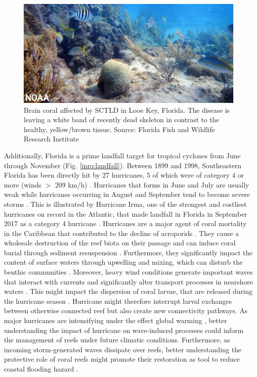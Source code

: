 \begin{figure}
    \centering
    \includegraphics[width=\textwidth]{chapters/intro/figures/sctld.jpg}
    \caption{Brain coral affected by SCTLD in Looe Key, Florida. The disease is leaving a white band of recently dead skeleton in contrast to the healthy, yellow/brown tissue. Source: Florida Fish and Wildlife Research Institute}
    \label{intro:sctld}
\end{figure}

Additionally, Florida is a prime landfall target for tropical cyclones from June through November (Fig. \ref{inro:landfall}). Between 1899 and 1998, Southeastern Florida has been directly hit by 27 hurricanes, 5 of which were of category 4 or more (winds $>$ 209 km/h) \citep{neumann1999tropical}. Hurricanes that forms in June and July are usually weak while hurricanes occurring in August and September tend to become severe storms \citep{banks2008reef}. This is illustrated by Hurricane Irma, one of the strongest and costliest hurricanes on record in the Atlantic, that made landfall in Florida in September 2017 as a category 4 hurricane \citep{irmaNOAA, xian2018brief}. Hurricanes are a major agent of coral mortality in the Caribbean that contributed to the decline of acroporids \citep{gardner2003long,aronson2001white}. They cause a wholesale destruction of the reef biota on their passage and can induce coral burial through sediment resuspension \citep{banks2008reef, miller2008effects, tweel2014contribution}. Furthermore, they significantly impact the content of surface waters through upwelling and mixing, which can disturb the benthic communities \citep{wachnicka2019hurricane,varlas2020investigating}. Moreover, heavy wind conditions generate important waves that interact with currents and significantly alter transport processes in nearshore waters \citep{niu2017role,mao2020particle}. This might impact the dispersion of coral larvae, that are released during the hurricane season \citep{frys2020fine}. Hurricane might therefore interrupt larval exchanges between otherwise connected reef but also create new connectivity pathways. As major hurricanes are intensifying under the effect global warming \citep{bhatia2019recent,knutson2020tropical}, better understanding the impact of hurricane on wave-induced processes could inform the management of reefs under future climatic conditions. Furthermore, as incoming storm-generated waves dissipate over reefs, better understanding the protective role of coral reefs might promote their restoration as tool to reduce coastal flooding hazard \citep{roelvink2021coral}.

